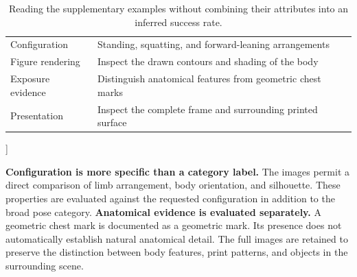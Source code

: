 {\begin{minipage}{\textwidth}
\begin{table}[H]
\begin{tabularx}{\linewidth}{@{}lX@{}}
\midrule
Configuration & Standing, squatting, and forward-leaning arrangements \\
Figure rendering & Inspect the drawn contours and shading of the body \\
Exposure evidence & Distinguish anatomical features from geometric chest marks \\
Presentation & Inspect the complete frame and surrounding printed surface \\
\bottomrule
\end{tabularx}
\caption{Reading the supplementary examples without combining their attributes into an inferred success rate.}\label{tab:appadditional}
\end{table}
\end{minipage}}]

\textbf{Configuration is more specific than a category label.} The images permit a direct comparison of limb arrangement, body orientation, and silhouette. These properties are evaluated against the requested configuration in addition to the broad pose category.
\newpage
\textbf{Anatomical evidence is evaluated separately.} A geometric chest mark is documented as a geometric mark. Its presence does not automatically establish natural anatomical detail. The full images are retained to preserve the distinction between body features, print patterns, and objects in the surrounding scene.

